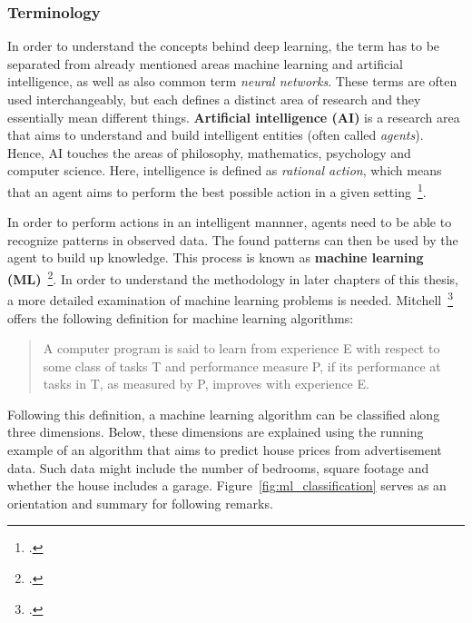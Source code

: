 \subsubsection{Terminology}
\label{sub:dl_terminology}

In order to understand the concepts behind deep learning, the term has to be
separated from already mentioned areas machine learning and artificial
intelligence, as well as also common term \textit{neural networks}. 
These terms are often used interchangeably, but each defines a distinct area of 
research and they essentially mean different things.
\textbf{Artificial intelligence (AI)} is a research area that aims to understand
and build intelligent entities (often called \textit{agents}). Hence, AI touches the 
areas of philosophy, mathematics, psychology and computer science. Here, 
intelligence is defined as \textit{rational action}, which means that an agent aims
to perform the best possible action in a given setting~\footcite{Russell1995}.

In order to perform actions in an intelligent mannner, agents need to be able
to recognize patterns in observed data. The found patterns can then be used
by the agent to build up knowledge. This process is known as \textbf{machine
learning (ML)}~\footcite{Goodfellow2016}. In order to understand the methodology in
later chapters of this thesis, a more detailed examination of machine learning
problems is needed. Mitchell~\footcite[2]{Mitchell1997} offers the following 
definition for machine learning algorithms:

\begin{quote}
  A computer program is said to learn from experience E with respect to some
  class of tasks T and performance measure P, if its performance at tasks in T,
  as measured by P, improves with experience E.
\end{quote}

Following this definition, a machine learning algorithm can be classified along
three dimensions. Below, these dimensions are explained using the running
example of an algorithm that aims to predict house prices from advertisement data.
Such data might include the number of bedrooms, square footage and whether
the house includes a garage. Figure~\ref{fig:ml_classification} serves as an orientation and summary for
following remarks.

